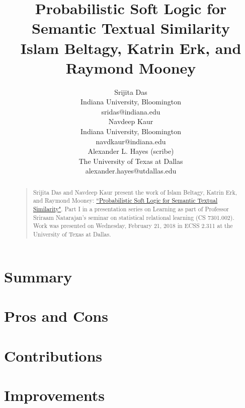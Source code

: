 \documentclass[letterpaper]{article}
\begin{document}
%
\title{Probabilistic Soft Logic for Semantic Textual Similarity\\
\large Islam Beltagy, Katrin Erk, and Raymond Mooney
}
\author{Srijita Das\\
Indiana University, Bloomington\\
sridas@indiana.edu\\
\And
Navdeep Kaur\\
Indiana University, Bloomington\\
navdkaur@indiana.edu\\
\And
Alexander L. Hayes (scribe)\\
The University of Texas at Dallas\\
alexander.hayes@utdallas.edu
}

\maketitle
\begin{abstract}
\begin{quote}
Srijita Das and Navdeep Kaur present the work of Islam Beltagy, Katrin Erk, and Raymond Mooney: \href{https://www.cs.utexas.edu/~ml/papers/beltagy.acl14.pdf}{``Probabilistic Soft Logic for Semantic Textual Similarity"}. Part I in a presentation series on Learning as part of Professor Sriraam Natarajan's seminar on statistical relational learning (CS 7301.002). Work was presented on Wednesday, February 21, 2018 in ECSS 2.311 at the University of Texas at Dallas.
\end{quote}
\end{abstract}

\section{Summary}

\section{Pros and Cons}

\section{Contributions}

\section{Improvements}
\end{document}

